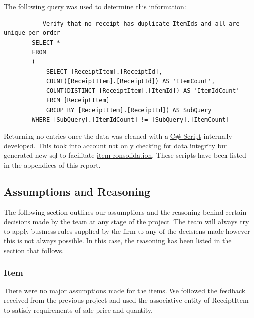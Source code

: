 \documentclass{article}
\begin{document}
        The following query was used to determine this information:
        \vspace{3mm}
        
        
        \begin{lstlisting}
        -- Verify that no receipt has duplicate ItemIds and all are unique per order
        SELECT *
        FROM
        (
            SELECT [ReceiptItem].[ReceiptId], 
            COUNT([ReceiptItem].[ReceiptId]) AS 'ItemCount',
            COUNT(DISTINCT [ReceiptItem].[ItemId]) AS 'ItemIdCount'
            FROM [ReceiptItem]
            GROUP BY [ReceiptItem].[ReceiptId]) AS SubQuery 
        WHERE [SubQuery].[ItemIdCount] != [SubQuery].[ItemCount]
        \end{lstlisting}

		\vspace{3mm}

        Returning no entries once the data was cleaned with a 
        \hyperref[sec:sharpccleaning]{\color{blue}C\# Script} internally developed.
        This took into account not only checking for data integrity
        but generated new sql to facilitate \hyperref[sec:sharpcsqlgeneration]{\color{blue}item consolidation}.
        These scripts have been listed in the appendices of this report.

\newpage


        \subsection{Assumptions and Reasoning}
        \label{sec:AR}
		The following section outlines our assumptions and the reasoning behind certain decisions
		made by the team at any stage of the project. The team will always try to apply business
		rules supplied by the firm to any of the decisions made however this is not always possible.
		In this case, the reasoning has been listed in the section that follows.        
        
            \subsubsection{Item}
                There were no major assumptions made for the items.
                We followed the feedback received from the previous project 
                and used the associative entity of ReceiptItem
                to satisfy requirements of sale price and quantity.
\end{document}
